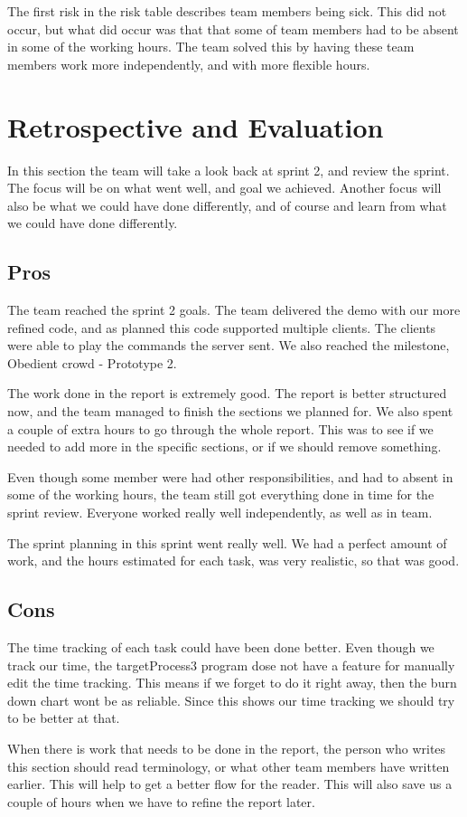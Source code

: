 The first risk in the risk table describes team members being sick. This did not occur, but what did occur was that that some of team members had to be absent in some of the working hours. 
The team solved this by having these team members work more independently, and with more flexible hours.  

\section{Retrospective and Evaluation}
In this section the team will take a look back at sprint 2, and review the sprint. The focus will be on what went well, and goal we achieved. Another focus will also be what we could have done differently, and of course and learn from what we could have done differently.

\subsection{Pros}
The team reached the sprint 2 goals. The team delivered the demo with our more refined code, and as planned this code supported multiple clients. The clients were able to play the commands the server sent. We also reached the milestone, Obedient crowd - Prototype 2.

The work done in the report is extremely good. The report is better structured now, and the team managed to finish the sections we planned for. We also spent a couple of extra hours to go through the whole report. This was to see if we needed to add more in the specific sections, or if we should remove something.  

Even though some member were had other responsibilities, and had to absent in some of the working hours, the team still got everything done in time for the sprint review. Everyone worked really well independently, as well as in team. 

The sprint planning in this sprint went really well. We had a perfect amount of work, and the hours estimated for each task, was very realistic, so that was good. 


\subsection{Cons}
The time tracking of each task could have been done better. 
Even though we track our time, the targetProcess3 program dose not have a feature for manually edit the time tracking. 
This means if we forget to do it right away, then the burn down chart wont be as reliable. Since this shows our time tracking we should try to be better at that.

When there is work that needs to be done in the report, the person who writes this section should read terminology, or what other team members have written earlier. This will help to get a better flow for the reader.
This will also save us a couple of hours when we have to refine the report later. 